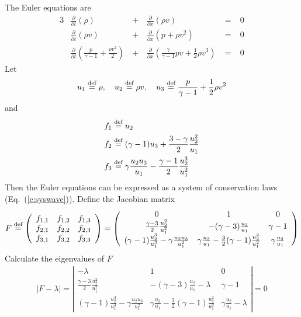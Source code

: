 \documentclass{turgon}
\begin{document}
The Euler equations are
\begin{alignat}{3}
  & \frac{\partial}{\partial t}(\rho)
    &\,+\,& \frac{\partial}{\partial x}(\rho v) &\;=\;& 0
  \label{e:euler1} \\
  & \frac{\partial}{\partial t}(\rho v)
    &\,+\,& \frac{\partial}{\partial x}(p+\rho v^2) &\;=\;& 0
  \label{e:euler2} \\
  & \frac{\partial}{\partial t}(\frac{p}{\gamma-1}+\frac{\rho v^2}{2})
    &\,+\,& \frac{\partial}{\partial x}
      (\frac{\gamma}{\gamma-1}pv+\frac{1}{2}\rho v^3) &\;=\;& 0
  \label{e:euler3}
\end{alignat}
Let
\begin{align*}
  u_1 \defeq \rho, \quad
  u_2 \defeq \rho v, \quad
  u_3 \defeq \frac{p}{\gamma-1} + \frac{1}{2}\rho v^2
\end{align*}
and
\begin{align*}
  &f_1 \defeq u_2 \\
  &f_2 \defeq (\gamma-1)u_3 + \frac{3-\gamma}{2}\frac{u_2^2}{u_1} \\
  &f_3 \defeq \gamma\frac{u_2u_3}{u_1}
             - \frac{\gamma-1}{2}\frac{u_2^3}{u_1^2}
\end{align*}
Then the Euler equations can be expressed as a system of conservation laws
(Eq.~(\ref{e:syswave})).  Define the Jacobian matrix
\begin{align}
  F \defeq
    \left(\begin{array}{ccc}
      f_{1,1} & f_{1,2} & f_{1,3} \\
      f_{2,1} & f_{2,2} & f_{2,3} \\
      f_{3,1} & f_{3,2} & f_{3,3}
    \end{array}\right)
    =
    \left(\begin{array}{ccc}
      0 & 1 & 0 \\
      \frac{\gamma-3}{2}\frac{u_2^2}{u_1^2} &
      -(\gamma-3)\frac{u_2}{u_1} &
      \gamma-1 \\
      (\gamma-1)\frac{u_2^3}{u_1^3} - \gamma\frac{u_2u_3}{u_1^2} &
      \gamma\frac{u_3}{u_1} - \frac{3}{2}(\gamma-1)\frac{u_2^2}{u_1^2} &
      \gamma\frac{u_2}{u_1}
    \end{array}\right)
  \label{e:euler_jacobian}
\end{align}
Calculate the eigenvalues of $F$
\begin{align*}
  |F-\lambda| =
    \left|\begin{array}{ccc}
      -\lambda & 1 & 0 \\
      \frac{\gamma-3}{2}\frac{u_2^2}{u_1^2}
      & -(\gamma-3)\frac{u_2}{u_1} - \lambda
      & \gamma-1 \\
      (\gamma-1)\frac{u_2^3}{u_1^3} - \gamma\frac{u_2u_3}{u_1^2}
      & \gamma\frac{u_3}{u_1} - \frac{3}{2}(\gamma-1)\frac{u_2^2}{u_1^2}
      & \gamma\frac{u_2}{u_1} - \lambda
    \end{array}\right| = 0
\end{align*}
\end{document}
